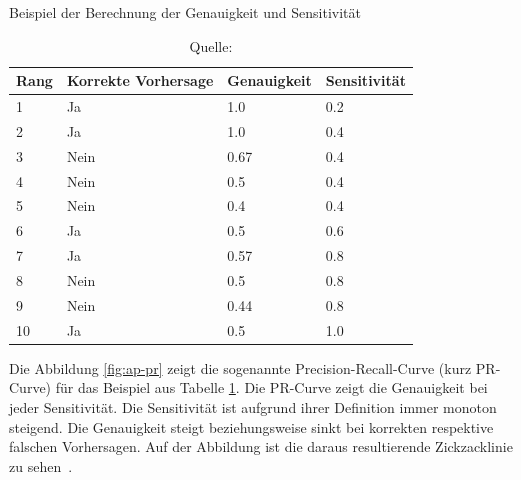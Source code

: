 \begin{table}[h!]
    \captionsetup{width=.9\linewidth}
    \caption{Beispiel der Berechnung der Genauigkeit und Sensitivität}
    \label{tab:ap-example}
    \centering
    \begin{tabular}{|l|l|l|l|} 
    \hline
    \rowcolor[HTML]{C0E5FD} \textbf{Rang} & \textbf{ Korrekte Vorhersage} & \textbf{Genauigkeit} & \textbf{Sensitivität}  \\ 
    \hline
    1    & Ja                  & 1.0         & 0.2           \\ 
    \hline
    2    & Ja                  & 1.0         & 0.4           \\ 
    \hline
    3    & Nein                & 0.67        & 0.4           \\ 
    \hline
    4    & Nein                & 0.5         & 0.4           \\ 
    \hline
    5    & Nein                & 0.4         & 0.4           \\ 
    \hline
    6    & Ja                  & 0.5         & 0.6           \\ 
    \hline
    7    & Ja                  & 0.57        & 0.8           \\ 
    \hline
    8    & Nein                & 0.5         & 0.8           \\ 
    \hline
    9    & Nein                & 0.44        & 0.8           \\ 
    \hline
    10   & Ja                  & 0.5         & 1.0           \\
    \hline
    \end{tabular}
    \vspace*{0.3cm}
    \caption*{Quelle: \textcite{AP}}
\end{table}

Die Abbildung \ref{fig:ap-pr} zeigt die sogenannte Precision-Recall-Curve (kurz PR-Curve) für das Beispiel aus Tabelle \ref{tab:ap-example}. Die PR-Curve zeigt die Genauigkeit bei jeder Sensitivität. Die Sensitivität ist aufgrund ihrer Definition immer monoton steigend. Die Genauigkeit steigt beziehungsweise sinkt bei korrekten respektive falschen Vorhersagen. Auf der Abbildung ist die daraus resultierende Zickzacklinie zu sehen~\autocite{AP}.

